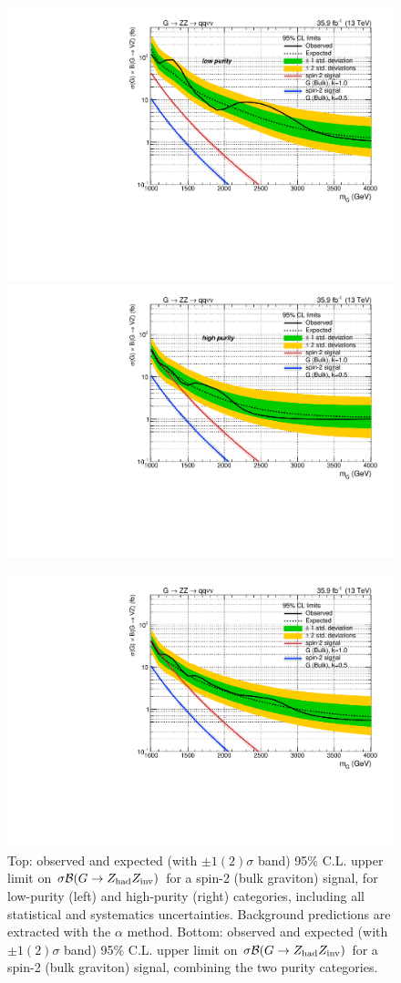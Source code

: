 \begin{figure}[!htb]
  \begin{center}
     \includegraphics[width=.495\textwidth]{plotsAlpha_tesi/Limits/Exclusion_XZZInv_XVZnnlp1p0_asymptotic.pdf}%
     \includegraphics[width=.495\textwidth]{plotsAlpha_tesi/Limits/Exclusion_XZZInv_XVZnnhp1p0_asymptotic.pdf}

     \includegraphics[width=.495\textwidth]{plotsAlpha_tesi/Limits/Exclusion_XZZInv_XVZnn1p0_asymptotic.pdf}
  \end{center}
  \caption{Top: observed and expected (with $\pm1(2)\sigma$ band) 95\% C.L. upper limit on $\sigma \mathcal{B} (G \rightarrow Z_{\text{had}} Z_{\text{inv}})$ for a spin-2 (bulk graviton) signal, for low-purity (left) and high-purity (right) categories, including all statistical and systematics uncertainties. Background predictions are extracted with the $\alpha$ method. Bottom: observed and expected (with $\pm1(2)\sigma$ band) 95\% C.L. upper limit on $\sigma \mathcal{B} (G \rightarrow Z_{\text{had}} Z_{\text{inv}})$ for a spin-2 (bulk graviton) signal, combining the two purity categories.}
  \label{fig:Limit_XZZInv}
\end{figure}

